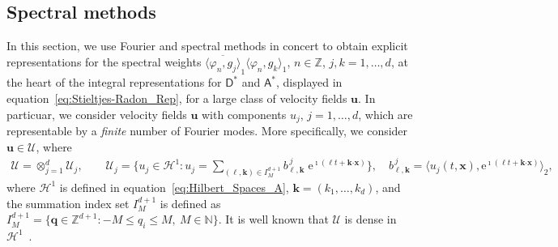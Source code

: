\documentclass[leqno,onefignum,onetabnum]{siamltex1213}
\newcommand{\e}{\mathrm{e}}
\newcommand{\Uc}{\mathcal{U}}
\newcommand{\Dm}{\mathsf{D}}
\newcommand{\Am}{\mathsf{A}}
\newcommand{\Hs}{\mathscr{H}}
\providecommand\bcdot{\boldsymbol{\cdot}}
\newcommand{\vecx}{\boldsymbol{x}}
\newcommand{\vecu}{\boldsymbol{u}}
\newcommand{\veck}{\boldsymbol{k}}
\newcommand{\vecq}{\boldsymbol{q}}
\begin{document}
%
\subsection{Spectral methods}
\label{sec:Spectral_Fourier_Methods}
%
In this section, we use Fourier and spectral methods in concert to
obtain explicit representations for the spectral weights
$\overline{\langle\varphi_n,g_j\rangle}_1\langle\varphi_n,g_k\rangle_1$, $n\in\mathbb{Z}$, $j,k=1,\ldots,d$, at
the heart of the integral representations for $\Dm^*$ and
$\Am^*$, displayed in equation~\eqref{eq:Stieltjes-Radon_Rep}, for
a large class of velocity fields $\vecu $. In particuar, we consider
velocity fields $\vecu $ with components $u_j$, $j=1,\ldots,d$, which are
representable by a \emph{finite} number of Fourier modes. More
specifically, we consider $\vecu \in\Uc$, where 
%
\begin{align}\label{eq:velocity_field_space}
  \Uc=\otimes_{j=1}^d\Uc_j, \qquad
  \Uc_j=\Big\{u_j\in\Hs^1:u_j=\sum_{(\ell,\veck)\in I_M^{d+1}}b^{\,j}_{\ell,\veck}\;\e^{\imath(\ell t+\veck\bcdot\vecx)}\Big\},
   \quad
  b^{\,j}_{\ell,\veck}=\big\langle u_j(t,\vecx),\e^{\imath(\ell t+\veck\bcdot\vecx)}\big\rangle_2, 
\end{align}
%
where $\Hs^1$ is defined in equation~\eqref{eq:Hilbert_Spaces_A},
$\veck=(k_1,\ldots,k_d)$, and the summation index set $I_M^{d+1}$ is defined as
$I_M^{d+1}=\{\vecq\in\mathbb{Z}^{d+1}:-M\leq q_i\leq M, \ M\in\mathbb{N}\}$. It is well
known that $\Uc$ is dense in $\Hs^1$~\cite{Folland:99:RealAnalysis}. 
\end{document}
